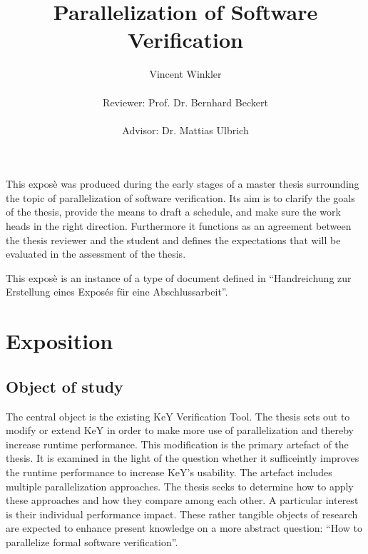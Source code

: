 \documentclass{scrartcl}
\title{Parallelization of Software Verification}
\author{
    Vincent Winkler\\
    \vspace{1em}\\
    Reviewer: Prof. Dr. Bernhard Beckert\\
    \vspace{1em}\\
    Advisor: Dr. Mattias Ulbrich
}
\begin{document}
\maketitle

This exposè was produced during the early stages of a master thesis
surrounding the topic of parallelization of software verification.
Its aim is to clarify the goals of the thesis, provide the means to draft a schedule,
and make sure the work heads in the right direction.
Furthermore it functions as an agreement between the thesis reviewer and the student
and defines the expectations that will be evaluated in the assessment of the thesis.

This exposè is an instance of a type of document defined in
\enquote{Handreichung zur Erstellung eines Exposés für eine Abschlussarbeit}.

\section{Exposition}
\subsection{Object of study}
The central object is the existing KeY Verification Tool.
The thesis sets out to modify or extend KeY in order to make more use of parallelization
and thereby increase runtime performance.
This modification is the primary artefact of the thesis.
It is examined in the light of the question whether it sufficeintly improves the runtime
performance to increase KeY's usability.
The artefact includes multiple parallelization approaches.
The thesis seeks to determine how to apply these approaches
and how they compare among each other.
A particular interest is their individual performance impact.
These rather tangible objects of research are expected
to enhance present knowledge on a more abstract question:
\enquote{How to parallelize formal software verification}.
\end{document}
